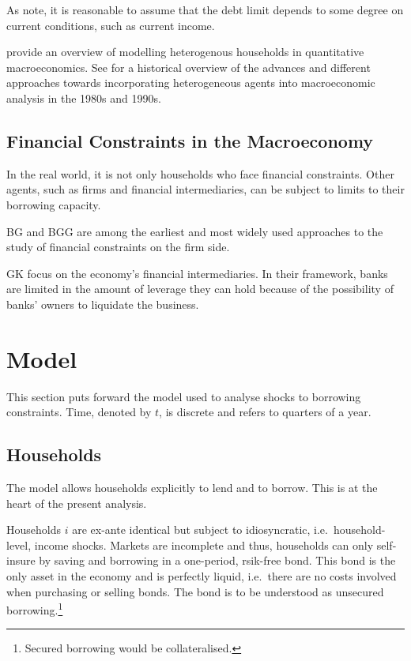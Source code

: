 \documentclass[12pt]{article}
\numberwithin{equation}{section} %
\begin{document}
As \textcite{egg2012} note, it is reasonable to assume that the debt limit depends to some degree on current conditions, such as current income.

\textcite{heath2009} provide an overview of modelling heterogenous households in quantitative macroeconomics. See \textcite{cherrier2023} for a historical overview of the advances and different approaches towards incorporating heterogeneous agents into macroeconomic analysis in the 1980s and 1990s.

\subsection{Financial Constraints in the Macroeconomy}
\label{sec:literature-finance}

In the real world, it is not only households who face financial constraints. Other agents, such as firms and financial intermediaries, can be subject to limits to their borrowing capacity.

BG and BGG are among the earliest and most widely used approaches to the study of financial constraints on the firm side.

GK focus on the economy's financial intermediaries. In their framework, banks are limited in the amount of leverage they can hold because of the possibility of banks' owners to liquidate the business.

\section{Model}
\label{sec:model}

This section puts forward the model used to analyse shocks to borrowing constraints. Time, denoted by $t$, is discrete and refers to quarters of a year.

\subsection{Households}
\label{sec:model-hh}

The model allows households explicitly to lend and to borrow. This is at the heart of the present analysis.

Households $i$ are ex-ante identical but subject to idiosyncratic, i.e.~household-level, income shocks. Markets are incomplete and thus, households can only self-insure by saving and borrowing in a one-period, rsik-free bond. This bond is the only asset in the economy and is perfectly liquid, i.e.~there are no costs involved when purchasing or selling bonds. The bond is to be understood as unsecured borrowing.\footnote{Secured borrowing would be collateralised.}
\end{document}

